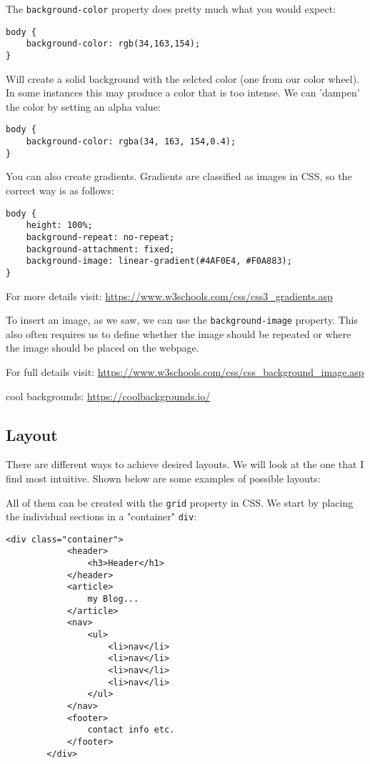 \documentclass[11pt,a4paper]{report}
\begin{document}
The \verb|background-color| property does pretty much what you would expect: 
\begin{lstlisting}[style=htmlcssjs]
body { 
	background-color: rgb(34,163,154);
}
\end{lstlisting}
Will create a solid background with the selcted color (one from our color wheel). In some instances this may produce a color that is too intense. We can 'dampen' the color by setting an alpha value: 
\begin{lstlisting}[style=htmlcssjs]
body {
    background-color: rgba(34, 163, 154,0.4);
}
\end{lstlisting}
You can also create gradients. Gradients are classified as images in CSS, so the correct way is as follows:
\begin{lstlisting}[style=htmlcssjs]
body {
    height: 100%;
    background-repeat: no-repeat;
    background-attachment: fixed;
    background-image: linear-gradient(#4AF0E4, #F0A883);
}
\end{lstlisting} 
For more details visit: \url{https://www.w3schools.com/css/css3_gradients.asp}

To insert an image, as we saw, we can use the \verb|background-image| property. This also often requires us to define whether the image should be repeated or where the image should be placed on the webpage.

For full details visit: \url{https://www.w3schools.com/css/css_background_image.asp}

cool backgrounds: \url{https://coolbackgrounds.io/}

\subsection{Layout}

There are different ways to achieve desired layouts. We will look at the one that I find most intuitive. Shown below are some examples of possible layouts:

%
%
%

All of them can be created with the \verb|grid| property in CSS.  We start by placing the individual sections in a "container" \verb|div|: 
\begin{lstlisting}[style=htmlcssjs]
<div class="container">
            <header>
                <h3>Header</h1>
            </header>
            <article>
                my Blog...
            </article>
            <nav>
                <ul>
                    <li>nav</li>
                    <li>nav</li>
                    <li>nav</li>
                    <li>nav</li>
                </ul>
            </nav>
            <footer>
                contact info etc.
            </footer>
        </div>
\end{lstlisting}
\end{document}
